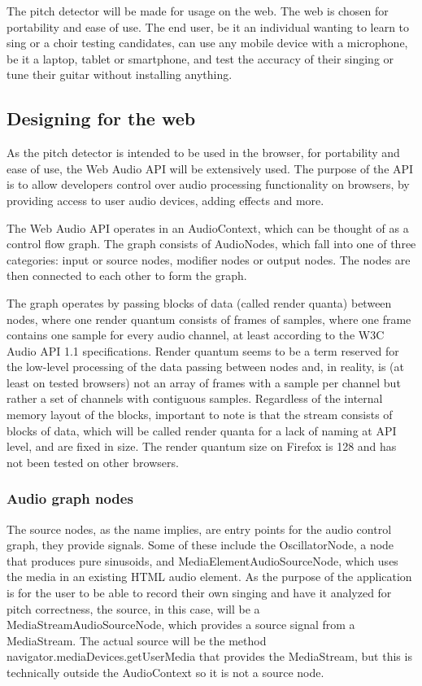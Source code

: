 The pitch detector will be made for usage on the web. The web is chosen for portability and ease of use. The end user, be it an individual wanting to learn to sing or a choir testing candidates, can use any mobile device with a microphone, be it a laptop, tablet or smartphone, and test the accuracy of their singing or tune their guitar without installing anything.

\subsection{Designing for the web}
As the pitch detector is intended to be used in the browser, for portability and ease of use, the Web Audio API will be extensively used. The purpose of the API is to allow developers control over audio processing functionality on browsers, by providing access to user audio devices, adding effects and more.  

The Web Audio API operates in an AudioContext, which can be thought of as a control flow graph. The graph consists of AudioNodes, which fall into one of three categories: input or source nodes, modifier nodes or output nodes. The nodes are then connected to each other to form the graph. 

The graph operates by passing blocks of data (called render quanta) between nodes, where one render quantum consists of frames of samples, where one frame contains one sample for every audio channel, at least according to the W3C Audio API 1.1 specifications. Render quantum seems to be a term reserved for the low-level processing of the data passing between nodes and, in reality, is (at least on tested browsers) not an array of frames with a sample per channel but rather a set of channels with contiguous samples. Regardless of the internal memory layout of the blocks, important to note is that the stream consists of blocks of data, which will be called render quanta for a lack of naming at API level, and are fixed in size. The render quantum size on Firefox is 128 and has not been tested on other browsers. 


\subsubsection{Audio graph nodes}
The source nodes, as the name implies, are entry points for the audio control graph, they provide signals. Some of these include the OscillatorNode, a node that produces pure sinusoids, and MediaElementAudioSourceNode, which uses the media in an existing HTML audio element. As the purpose of the application is for the user to be able to record their own singing and have it analyzed for pitch correctness, the source, in this case, will be a MediaStreamAudioSourceNode, which provides a source signal from a MediaStream. The actual source will be the method navigator.mediaDevices.getUserMedia\(\) that provides the MediaStream, but this is technically outside the AudioContext so it is not a source node.

